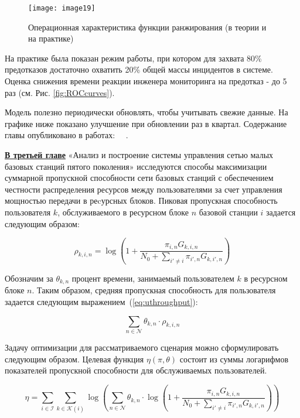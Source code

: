 \begin{figure}
\centering
\texttt{[image: image19]}
\caption{Операционная характеристика функции ранжирования (в теории и на практике)}
\centering
\label{fig:image19}
\end{figure}

На практике была показан режим работы, при котором для захвата 80\% предотказов достаточно охватить 20\% общей массы инцидентов в системе. Оценка снижения времени реакции инженера мониторинга на предотказ - до 5 раз (см. Рис. \ref{fig:ROCcurves}).

Модель полезно периодически обновлять, чтобы учитывать свежие данные. На графике ниже показано улучшение при обновлении раз в квартал.
Содержание главы опубликовано в работах:~\cite{itivs-2017} ~\cite{bulletin-rzd}.



\underline{\textbf{В третьей главе}} «Анализ и построение системы управления сетью малых базовых станций пятого поколения» исследуются способы максимизации суммарной пропускной способности сети базовых станций с обеспечением честности распределения ресурсов между пользователями за счет управления мощностью передачи в реcурсных блоков. Пиковая пропускная способность пользователя $k$, обслуживаемого в ресурсном блоке $n$ базовой станции $i$ задается следующим образом:

\begin{equation}
    \label{eq:throughput}
    \rho_{k,i,n} = \log \left(1 + \frac{\pi_{i,n} G_{k,i,n}}{N_0 + \sum_{i'\neq i}{\pi_{i',n} G_{k,i',n}}}\right)
\end{equation}

Обозначим за $\theta_{k,n}$ процент времени, занимаемый пользователем $k$ в ресурсном блоке $n$. Таким образом, средняя пропускная способность для пользователя задается следующим выражением~(\ref{eq:uthroughput}):

\begin{equation}
    \label{eq:uthroughput}
    \sum_{n \in \mathcal{N}} \theta_{k,n} \cdot \rho_{k,i,n}
\end{equation}

Задачу оптимизации для рассматриваемого сценария можно сформулировать следующим образом. Целевая функция $\eta(\pi, \theta)$ состоит из суммы логарифмов показателей пропускной способности для обслуживаемых пользователей.

\begin{equation}
\label{eq:maximize}
\eta = \sum_{i \in \mathcal{I}} \sum_{k \in \mathcal{K}(i)} \log \left(\sum_{n \in \mathcal{N}} \theta_{k,n} \cdot \log \left(1 + \frac{\pi_{i,n} G_{k,i,n}}{N_0 + \sum_{i'\neq i}{\pi_{i',n} G_{k,i',n}}}\right)\right)
\end{equation}

